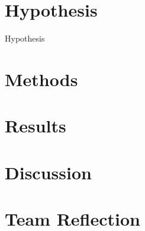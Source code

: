 \section{Hypothesis}
Hypothesis

\section{Methods}

\section{Results}

\section{Discussion}


\section*{Team Reflection}




\vfill


%
%

